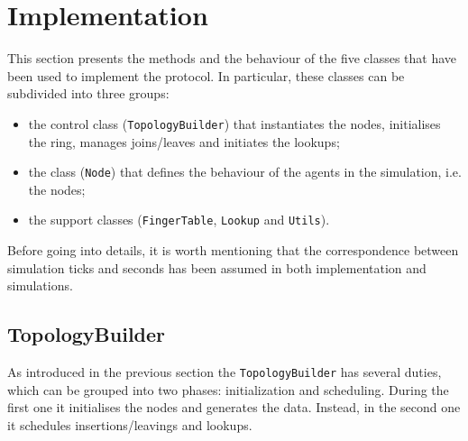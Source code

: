 \documentclass[11pt,twocolumn,letterpaper]{article}
\begin{document}
	\section{Implementation}
	\label{sec:implementation}
	This section presents the methods and the behaviour of the five classes that have been used to implement the protocol. In particular, these classes can be subdivided into three groups:
	\begin{itemize}
		\item the control class (\texttt{TopologyBuilder}) that instantiates the nodes, initialises the ring, manages joins/leaves and initiates the lookups;
		\item the class (\texttt{Node}) that defines the behaviour of the agents in the simulation, i.e. the nodes;
		\item the support classes (\texttt{FingerTable}, \texttt{Lookup} and \texttt{Utils}).
	\end{itemize}
	Before going into details, it is worth mentioning that the correspondence between simulation ticks and seconds has been assumed in both implementation and simulations. 
	
	\subsection{TopologyBuilder}
	\label{subsec:topbuilder}
	As introduced in the previous section the \texttt{TopologyBuilder} has several duties, which can be grouped into two phases: initialization and scheduling. During the first one it initialises the nodes and generates the data. Instead, in the second one it schedules insertions/leavings and lookups.
	
\end{document}
